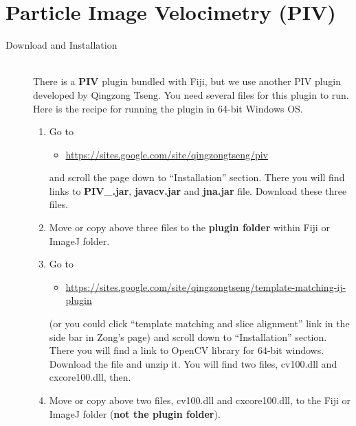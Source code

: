 \documentclass[11pnt]{article}
\begin{document}
\section{Particle Image Velocimetry (PIV)}

\begin{description}
\item[Download and Installation]\hfill\\

There is a \textbf{PIV} plugin bundled with Fiji, but we use another PIV plugin developed by Qingzong Tseng. You need several files for this plugin to run. Here is the recipe for running the plugin in 64-bit Windows OS. 
 
\begin{enumerate}
\item Go to 
\begin{itemize}
\item\url{https://sites.google.com/site/qingzongtseng/piv} 
\end{itemize}
and scroll the page down to ``Installation'' section. There you will find links to \textbf{PIV\_.jar}, \textbf{javacv.jar} and \textbf{jna.jar} file. Download these three files.

\item Move or copy above three files to the \textbf{plugin folder} within Fiji or ImageJ folder. 

\item Go to 
\begin{itemize}
\item\url{https://sites.google.com/site/qingzongtseng/template-matching-ij-plugin} 
\end{itemize}
(or you could click ``template matching and slice alignment'' link in the side bar in Zong's page) and scroll down to ``Installation'' section. There you will find a link to OpenCV library for 64-bit windows. Download the file and unzip it. You will find two files, cv100.dll and cxcore100.dll, then. 

\item Move or copy above two files, cv100.dll and cxcore100.dll, to the Fiji or ImageJ folder (\textbf{not the plugin folder}).

\end{enumerate}




\end{description}
\end{document}
